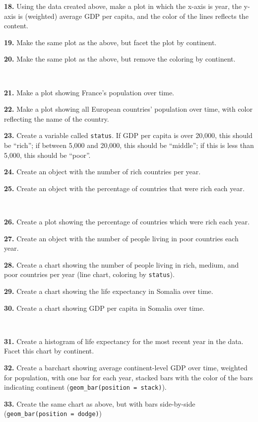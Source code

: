\documentclass[
]{book}
\begin{document}
\textbf{18.} Using the data created above, make a plot in which the x-axis is year, the y-axis is (weighted) average GDP per capita, and the color of the lines reflects the content.

\textbf{19.} Make the same plot as the above, but facet the plot by continent.

\textbf{20.} Make the same plot as the above, but remove the coloring by continent.

~

\textbf{21.} Make a plot showing France's population over time.

\textbf{22.} Make a plot showing all European countries' population over time, with color reflecting the name of the country.

\textbf{23.} Create a variable called \texttt{status}. If GDP per capita is over 20,000, this should be ``rich''; if between 5,000 and 20,000, this should be ``middle''; if this is less than 5,000, this should be ``poor''.

\textbf{24.} Create an object with the number of rich countries per year.

\textbf{25.} Create an object with the percentage of countries that were rich each year.

~

\textbf{26.} Create a plot showing the percentage of countries which were rich each year.

\textbf{27.} Create an object with the number of people living in poor countries each year.

\textbf{28.} Create a chart showing the number of people living in rich, medium, and poor countries per year (line chart, coloring by \texttt{status}).

\textbf{29.} Create a chart showing the life expectancy in Somalia over time.

\textbf{30.} Create a chart showing GDP per capita in Somalia over time.

~

\textbf{31.} Create a histogram of life expectancy for the most recent year in the data. Facet this chart by continent.

\textbf{32.} Create a barchart showing average continent-level GDP over time, weighted for population, with one bar for each year, stacked bars with the color of the bars indicating continent (\texttt{geom\_bar(position\ =\ \textquotesingle{}stack\textquotesingle{})}).

\textbf{33.} Create the same chart as above, but with bars side-by-side (\texttt{geom\_bar(position\ =\ \textquotesingle{}dodge\textquotesingle{})})
\end{document}

